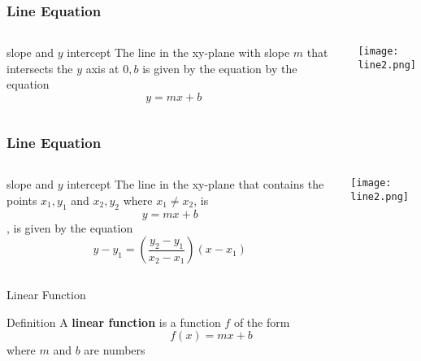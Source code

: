 \begin{frame}
  \frametitle{Line Equation}
  \begin{columns} 
  \begin{alertblock}{slope and \(y\) intercept}
    The line in the xy-plane with slope \(m\) that intersects the \(y\) axis at \(0,b\) is given by the equation 
by the equation 
\[y = mx+b\]
  \end{alertblock}

  \centering
  \texttt{[image: line2.png]} %
  \end{columns}

\end{frame}

\begin{frame}
  \frametitle{Line Equation}
  \begin{columns} 
  \begin{alertblock}{slope and \(y\) intercept}
    The line in the xy-plane that contains the points \(x_{1},y_{1}\) and \(x_{2}, y_{2}\) where \(x_{1} \neq x_{2}\), is  
\[y = mx+b\], is given by the equation 
\[y-y_{1} = \left( \frac{y_{2} - y_{1}}{x_{2} - x_{1}} \right) (x-x_{1})\] 
  \end{alertblock}

  \centering
  \texttt{[image: line2.png]} %
  \end{columns}

\end{frame}

\begin{frame}{Linear Function}
  \begin{block}{Definition}
    A \textbf{linear function} is a function \(f\) of the form 
    \[f(x) = mx + b\]
    where \(m\) and \(b\) are numbers
    
  \end{block}
\end{frame}

